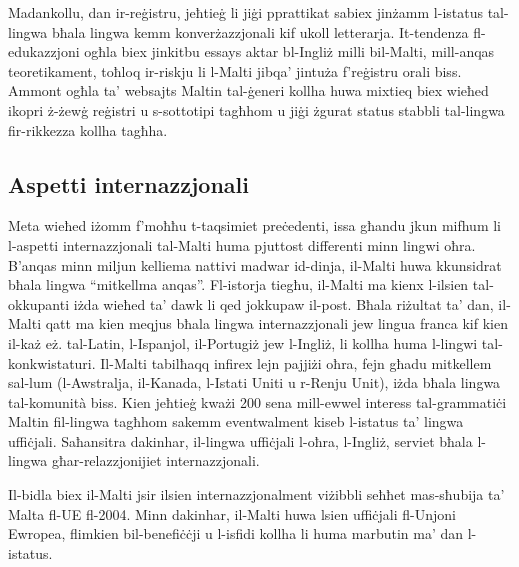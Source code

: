 \documentclass[]{../../metanetpaper}
\begin{document}
\begin{multicols}{2}
Madankollu, dan ir-reġistru, jeħtieġ li jiġi pprattikat sabiex jinżamm l-istatus tal-lingwa bħala lingwa kemm konverżazzjonali kif ukoll letterarja. It-tendenza fl-edukazzjoni ogħla biex jinkitbu essays aktar bl-Ingliż milli bil-Malti, mill-anqas teoretikament, toħloq ir-riskju li l-Malti jibqa’ jintuża f’reġistru orali biss. Ammont ogħla ta’ websajts Maltin tal-ġeneri kollha huwa mixtieq biex wieħed ikopri ż-żewġ reġistri u s-sottotipi tagħhom u jiġi żgurat status stabbli tal-lingwa fir-rikkezza kollha tagħha.

\subsection{Aspetti internazzjonali}

Meta wieħed iżomm f’moħħu t-taqsimiet preċedenti, issa għandu jkun mifhum li l-aspetti internazzjonali tal-Malti huma pjuttost differenti minn lingwi oħra. B’anqas minn miljun kelliema nattivi madwar id-dinja, il-Malti huwa kkunsidrat bħala lingwa ``mitkellma anqas''. Fl-istorja tiegħu, il-Malti ma kienx l-ilsien tal-okkupanti iżda wieħed ta’ dawk li qed jokkupaw il-post. Bħala riżultat ta’ dan, il-Malti qatt ma kien meqjus bħala lingwa internazzjonali jew lingua franca kif kien il-każ eż. tal-Latin, l-Ispanjol, il-Portugiż jew l-Ingliż, li kollha huma l-lingwi tal-konkwistaturi. Il-Malti tabilħaqq infirex lejn pajjiżi oħra, fejn għadu mitkellem sal-lum (l-Awstralja, il-Kanada, l-Istati Uniti u r-Renju Unit), iżda bħala lingwa tal-komunità biss. Kien jeħtieġ kważi 200 sena mill-ewwel interess tal-grammatiċi Maltin fil-lingwa tagħhom sakemm eventwalment kiseb l-istatus ta’ lingwa uffiċjali. Saħansitra dakinhar, il-lingwa uffiċjali l-oħra, l-Ingliż, serviet bħala l-lingwa għar-relazzjonijiet internazzjonali.

Il-bidla biex il-Malti jsir ilsien internazzjonalment viżibbli seħħet mas-sħubija ta’ Malta fl-UE fl-2004. Minn dakinhar, il-Malti huwa lsien uffiċjali fl-Unjoni Ewropea, flimkien bil-benefiċċji u l-isfidi kollha li huma marbutin ma’ dan l-istatus.


\end{multicols}
\end{document}
